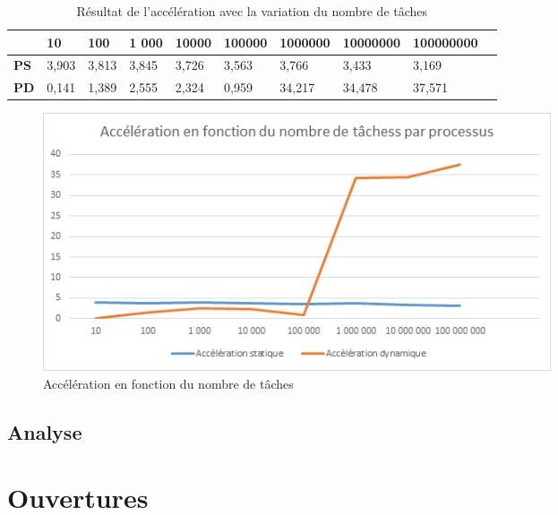 \documentclass[a4paper,12pt]{article}
\begin{document}
\begin{table}[H]
\caption{Résultat de l'accélération avec la variation du nombre de tâches}
\label{tab:acc3}
\begin{tabular}{|l|l|l|l|l|l|l|l|l|l|}
\hline
            & \textbf{10} & \textbf{100} & \textbf{1 000} & \textbf{10000} & \textbf{100000} & \textbf{1000000} & \textbf{10000000} & \textbf{100000000} \\ \hline
\textbf{PS} & 3,903       & 3,813        & 3,845          & 3,726          & 3,563           & 3,766            & 3,433             & 3,169              \\ \hline
\textbf{PD} & 0,141       & 1,389        & 2,555          & 2,324          & 0,959           & 34,217           & 34,478            & 37,571             \\ \hline

\end{tabular}
\end{table}

\begin{figure}[H]
\center \includegraphics[width=15cm]{acc3} %
\caption{Accélération en fonction du nombre de tâches}
\label{fig:acc3}
\end{figure}

\subsection{Analyse}


\section{Ouvertures}

\newpage

\nocite{*} %


\end{document}

